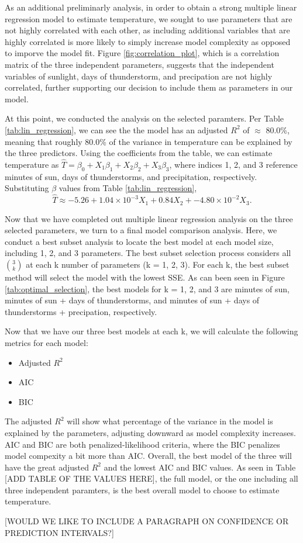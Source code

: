 As an additional preliminarly analysis, in order to obtain a strong multiple linear regression model to estimate temperature, we sought to use parameters that are not highly correlated with each other, as including additional variables that are highly correlated is more likely to simply increase model complexity as opposed to imporve the model fit. Figure \ref{fig:correlation_plot}, which is a correlation matrix of the three independent parameters, suggests that the independent variables of sunlight, days of thunderstorm, and precipation are not highly correlated, further supporting our decision to include them as parameters in our model.

At this point, we conducted the analysis on the selected paramters. Per Table \ref{tab:lin_regression}, we can see the the model has an adjusted $R^{2}$ of $\approx$ 80.0\%, meaning that roughly 80.0\% of the variance in temperature can be explained by the three predictors. Using the coefficients from the table, we can estimate temperature as $\hat{T} = \beta_{0} + X_{1}\beta_{1} + X_{2}\beta_{2} + X_{3}\beta_{3}$, where indices 1, 2, and 3 reference minutes of sun, days of thunderstorms, and precipitation, respectively. Substituting $\beta$ values from Table \ref{tab:lin_regression}, $$\hat{T} \approx -5.26 + 1.04 \times 10^{-3}X_{1} + 0.84X_{2} + -4.80\times 10^{-2}X_{3}.$$

Now that we have completed out multiple linear regression analysis on the three selected parameters, we turn to a final model comparison analysis. Here, we conduct a best subset analysis to locate the best model at each model size, including 1, 2, and 3 parameters. The best subset selection process considers all $3 \choose k$ at each k number of parameters (k = 1, 2, 3). For each k, the best subset method will select the model with the lowest SSE. As can been seen in Figure \ref{tab:optimal_selection}, the best models for k = 1, 2, and 3 are minutes of sun, minutes of sun + days of thunderstorms, and minutes of sun + days of thunderstorms + precipation, respectively.

Now that we have our three best models at each k, we will calculate the following metrics for each model: 

\begin{itemize}
	\item Adjusted $R^{2}$
	\item AIC
	\item BIC
\end{itemize}

The adjusted $R^{2}$ will show what percentage of the variance in the model is explained by the parameters, adjusting downward as model complexity increases. AIC and BIC are both penalized-likelihood criteria, where the BIC penalizes model compexity a bit more than AIC. Overall, the best model of the three will have the great adjusted $R^{2}$ and the lowest AIC and BIC values. As seen in Table [ADD TABLE OF THE VALUES HERE], the full model, or the one including all three independent paramters, is the best overall model to choose to estimate temperature.

[WOULD WE LIKE TO INCLUDE A PARAGRAPH ON CONFIDENCE OR PREDICTION INTERVALS?]
